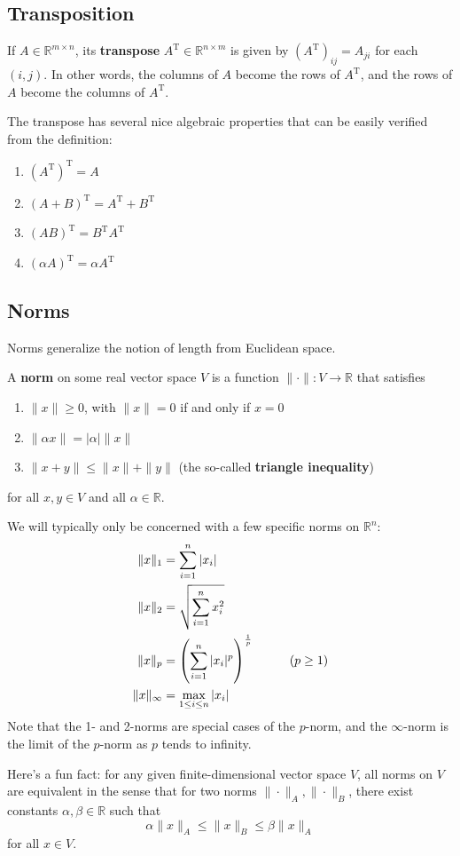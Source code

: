 \documentclass{article}
\newcommand{\R}{\mathbb{R}}
\newcommand{\tran}{^\text{T}}
\newcommand{\term}[1]{\textbf{#1}}
\newcommand{\tab}{\hspace{0.5cm}}
\begin{document}
\subsection{Transposition}
If $A \in \R^{m \times n}$, its \term{transpose} $A\tran \in \R^{n \times m}$ is given by $(A\tran)_{ij} = A_{ji}$ for each $(i, j)$. In other words, the columns of $A$ become the rows of $A\tran$, and the rows of $A$ become the columns of $A\tran$.

The transpose has several nice algebraic properties that can be easily verified from the definition:
\begin{enumerate}
\item $(A\tran)\tran = A$
\item $(A+B)\tran = A\tran + B\tran$
\item $(AB)\tran = B\tran A\tran$
\item $(\alpha A)\tran = \alpha A\tran$
\end{enumerate}

\subsection{Norms}
Norms generalize the notion of length from Euclidean space.

A \term{norm} on some real vector space $V$ is a function $\|\cdot\| : V \to \R$ that satisfies
\begin{enumerate}
\item $\|x\| \geq 0$, with $\|x\| = 0$ if and only if $x = 0$
\item $\|\alpha x\| = |\alpha|\|x\|$
\item $\|x+y\| \leq \|x\| + \|y\|$ (the so-called \term{triangle inequality})
\end{enumerate}
for all $x,y \in V$ and all $\alpha \in \R$.

We will typically only be concerned with a few specific norms on $\R^n$:
\begin{align*}
\|x\|_1 &= \sum_{i=1}^n |x_i| \\
\|x\|_2 &= \sqrt{\sum_{i=1}^n x_i^2} \\
\|x\|_p &= \left(\sum_{i=1}^n |x_i|^p\right)^\frac{1}{p} \tab\tab (p \geq 1) \\
\|x\|_\infty &= \max_{1 \leq i \leq n} |x_i|
\end{align*}
Note that the 1- and 2-norms are special cases of the $p$-norm, and the $\infty$-norm is the limit of the $p$-norm as $p$ tends to infinity.

Here's a fun fact: for any given finite-dimensional vector space $V$, all norms on $V$ are equivalent in the sense that for two norms $\|\cdot\|_A, \|\cdot\|_B$, there exist constants $\alpha, \beta \in \R$ such that
\[\alpha\|x\|_A \leq \|x\|_B \leq \beta\|x\|_A\]
for all $x \in V$.
\end{document}
